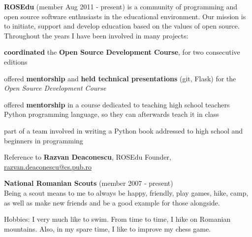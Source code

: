 \documentclass[margin,line]{resume}
\begin{document}
\begin{resume}
	\textbf{ROSEdu} (member Aug 2011 - present) is a community of
	programming and open source software enthusiasts in the educational environment. Our mission is to
	initiate, support and develop education based on the values of open source.\vspace{1mm}
	Throughout the years I have been involved in many projects:
	\begin{list2}
        \item \textbf{coordinated} the \textbf{Open Source Development Course}, for two consecutive editions
        \item offered \textbf{mentorship} and \textbf{held technical presentations} (git, Flask) for the \textit{Open Source Development Course}
        \item offered \textbf{mentorship} in a course dedicated to teaching high school teachers Python programming language, so they can afterwards teach it in class
        \item part of a team involved in writing a Python book addressed to high school and beginners in programming
	\end{list2}\vspace{-3mm}
	\small{Reference to \textbf{Razvan Deaconescu}, ROSEdu Founder, \href{mailto:razvan.deaconescu@cs.pub.ro}{razvan.deaconescu@cs.pub.ro}}

	\textbf{National Romanian Scouts} (member 2007 - present)\vspace{1mm}\\
	Being a scout means to me to always be happy, friendly, play games, hike, camp, as well as make new friends and be a good example for those alongside.

	Hobbies: I very much like to swim. From time to time, I hike on Romanian mountains. Also, in my spare time, I like to improve my chess game.



\end{resume}
\end{document}
